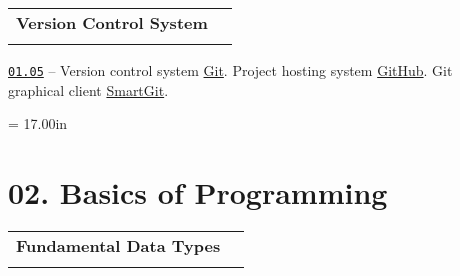 \documentclass[a4paper,12pt]{article}
\renewenvironment{itemize}
{
    \begin{list}{\labelitemi}
    {
      \setlength{\topsep}{0pt}
      \setlength{\partopsep}{0pt}
      \setlength{\parskip}{0pt}
      \setlength{\itemsep}{0pt}
      \setlength{\parsep}{0pt}
      \setlength{\leftmargin}{14.5pt}
    }
}{\end{list}}
\begin{document}
\bigskip\medskip

\begin{tabular}{!{\vrule width 1pt}L{4.7cm}!{\vrule width 1pt}L{14.3cm}!{\vrule width 0pt}} 


\textbf{Version Control System} & \\


\end{tabular}

\medskip\smallskip

\begin{itemize}

    \item \href{https://github.com/i-s-m-mipt/Education/blob/master/projects/examples/source/01.05.pdf}{\texttt{01.05}} -- Version control system \href{https://git-scm.com/}{Git}. Project hosting system \href{https://github.com/}{GitHub}. Git graphical client \href{https://www.smartgit.dev/}{SmartGit}.
    
\end{itemize}



\newpage\thispagestyle{empty}\pdfpageheight = 17.00in\enlargethispage{100in}

\section{02. Basics of Programming}

\begin{tabular}{!{\vrule width 1pt}L{5.0cm}!{\vrule width 1pt}L{14.0cm}!{\vrule width 0pt}} 


\textbf{Fundamental Data Types} & \\


\end{tabular}

\medskip\smallskip
\end{document}
